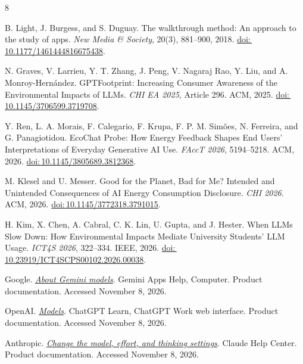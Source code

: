 \documentclass[11pt,letterpaper]{article}
\newcommand{\doi}[1]{\href{https://doi.org/#1}{doi:\,#1}}
\begin{document}
\begin{thebibliography}{8}

B. Light, J. Burgess, and S. Duguay.
The walkthrough method: An approach to the study of apps.
\emph{New Media \& Society}, 20(3), 881--900, 2018.
\doi{10.1177/1461444816675438}.

N. Graves, V. Larrieu, Y. T. Zhang, J. Peng, V. Nagaraj Rao, Y. Liu,
and A. Monroy-Hern\'andez.
GPTFootprint: Increasing Consumer Awareness of the Environmental
Impacts of LLMs.
\emph{CHI EA 2025}, Article 296. ACM, 2025.
\doi{10.1145/3706599.3719708}.

Y. Ren, L. A. Morais, F. Calegario, F. Krupa, F. P. M. Sim\~oes,
N. Ferreira, and G. Panagiotidou.
EcoChat Probe: How Energy Feedback Shapes End Users' Interpretations
of Everyday Generative AI Use.
\emph{FAccT 2026}, 5194--5218. ACM, 2026.
\doi{10.1145/3805689.3812368}.

M. Klesel and U. Messer.
Good for the Planet, Bad for Me? Intended and Unintended Consequences
of AI Energy Consumption Disclosure.
\emph{CHI 2026}. ACM, 2026.
\doi{10.1145/3772318.3791015}.

H. Kim, X. Chen, A. Cabral, C. K. Lin, U. Gupta, and J. Hester.
When LLMs Slow Down: How Environmental Impacts Mediate University
Students' LLM Usage.
\emph{ICT4S 2026}, 322--334. IEEE, 2026.
\doi{10.23919/ICT4SCPS00102.2026.00038}.

Google.
\href{https://support.google.com/gemini/answer/18648722?co=GENIE.Platform\%3DDesktop\&hl=en}
{\emph{About Gemini models}}.
Gemini Apps Help, Computer. Product documentation.
Accessed November 8, 2026.

OpenAI.
\href{https://learn.chatgpt.com/docs/models?surface=web}{\emph{Models}}.
ChatGPT Learn, ChatGPT Work web interface. Product documentation.
Accessed November 8, 2026.

Anthropic.
\href{https://support.claude.com/en/articles/8664678-change-the-model-effort-and-thinking-settings}
{\emph{Change the model, effort, and thinking settings}}.
Claude Help Center. Product documentation. Accessed November 8, 2026.

\end{thebibliography}
\end{document}
